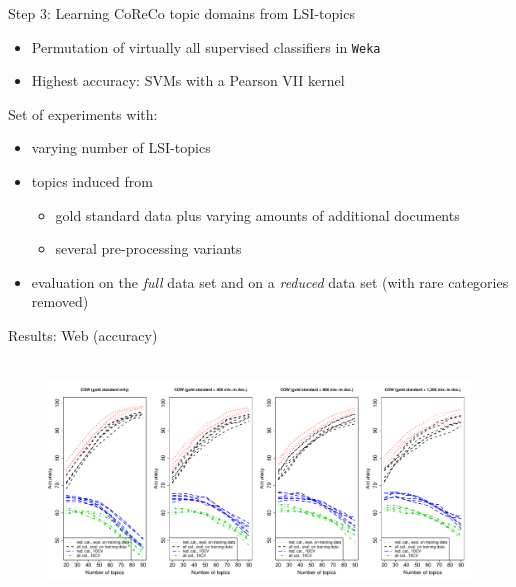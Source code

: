 \documentclass{beamer}
\begin{document}
\begin{frame}
  {Step 3: Learning CoReCo topic domains from LSI-topics}
  \begin{itemize}
    \item Permutation of virtually all supervised classifiers in \texttt{Weka}\\ \citep{HallWitten2011}
    \item Highest accuracy: SVMs with a Pearson VII kernel\\ \citep{UstunEa2006}
  \end{itemize}
  \vspace{.5cm}
\pause
Set of experiments with:
  \begin{itemize}
    \item varying number of LSI-topics
    \item topics induced from
      \begin{itemize} 
        \item gold standard data plus varying amounts of additional documents
        \item several pre-processing variants
      \end{itemize}
    \item evaluation on the \textit{full} data set and on a \textit{reduced} data set (with rare categories removed)
  \end{itemize}
\end{frame}


\begin{frame}
  {Results: Web (accuracy)}
  \begin{figure}
    \centering
    \includegraphics[width=\textwidth, height=6.4cm]{graphics/acc_cow.pdf}
  \end{figure}
  \vspace{-.3cm}
  \centering
\end{frame}
\end{document}

